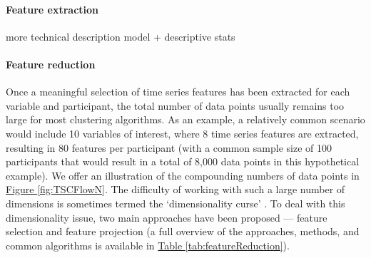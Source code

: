 \documentclass[man, 12pt, a4paper, mask, floatsintext]{apa7}
\theoremstyle{break}
\theoremstyle{plain}
\newcommand{\fgrref}[2][]{\hyperref[#2]{Figure \ref*{#2}#1}}
\newcommand{\tblref}[2][]{\hyperref[#2]{Table \ref*{#2}#1}}
\begin{document}
\paragraph{Feature extraction}
more technical description model + descriptive stats



\paragraph{Feature reduction}
Once a meaningful selection of time series features has been extracted for each variable and participant, the total number of data points usually remains too large for most clustering algorithms. As an example, a relatively common scenario would include 10 variables of interest, where 8 time series features are extracted, resulting in 80 features per participant (with a common sample size of 100 participants that would result in a total of 8,000 data points in this hypothetical example). We offer an illustration of the compounding numbers of data points in \fgrref{fig:TSCFlowN}. The difficulty of working with such a large number of dimensions is sometimes termed the `dimensionality curse' \citep[e.g.,][]{altman2018}. To deal with this dimensionality issue, two main approaches have been proposed --- feature selection and feature projection (a full overview of the approaches, methods, and common algorithms is available in \tblref{tab:featureReduction}). 
\end{document}
